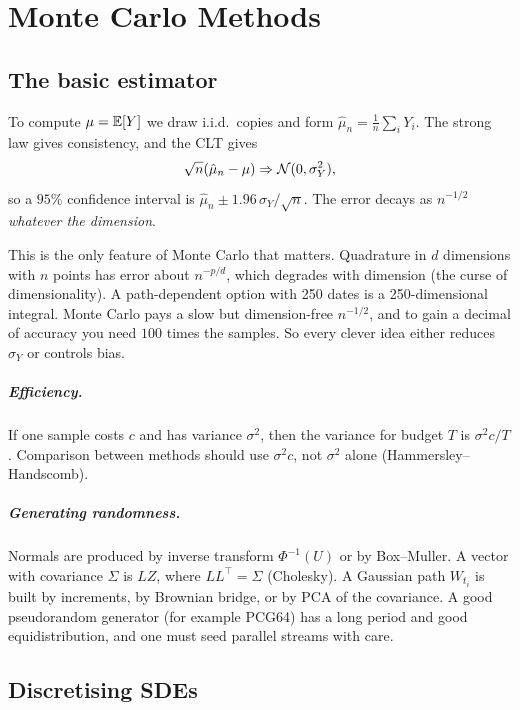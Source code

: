 \chapter{Monte Carlo Methods}\label{ch:mc}

\section{The basic estimator}

To compute $\mu=\mathbb{E}[Y]$ we draw i.i.d.\ copies and form $\hat\mu_n=\frac1n\sum_iY_i$. The strong law gives consistency, and the CLT gives
\[
\sqrt n(\hat\mu_n-\mu)\Rightarrow\mathcal{N}(0,\sigma_Y^2),
\]
so a $95\%$ confidence interval is $\hat\mu_n\pm1.96\,\hat\sigma_Y/\sqrt n$. The error decays as $n^{-1/2}$ \emph{whatever the dimension}.

\begin{intuition}
This is the only feature of Monte Carlo that matters. Quadrature in $d$ dimensions with $n$ points has error about $n^{-p/d}$, which degrades with dimension (the curse of dimensionality). A path-dependent option with 250 dates is a 250-dimensional integral. Monte Carlo pays a slow but dimension-free $n^{-1/2}$, and to gain a decimal of accuracy you need $100$ times the samples. So every clever idea either reduces $\sigma_Y$ or controls bias.
\end{intuition}

\paragraph{Efficiency.} If one sample costs $c$ and has variance $\sigma^2$, then the variance for budget $T$ is $\sigma^2c/T$. Comparison between methods should use $\sigma^2c$, not $\sigma^2$ alone (Hammersley--Handscomb).

\paragraph{Generating randomness.} Normals are produced by inverse transform $\Phi^{-1}(U)$ or by Box--Muller. A vector with covariance $\Sigma$ is $LZ$, where $LL^\top=\Sigma$ (Cholesky). A Gaussian path $W_{t_i}$ is built by increments, by Brownian bridge, or by PCA of the covariance. A good pseudorandom generator (for example PCG64) has a long period and good equidistribution, and one must seed parallel streams with care.

\section{Discretising SDEs}

